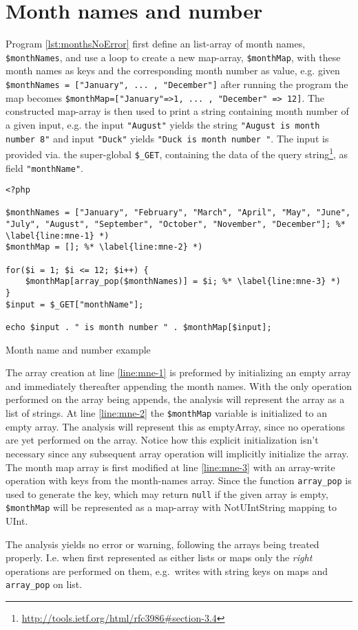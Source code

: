 \section{Month names and number}


Program \ref{lst:monthsNoError} first define an list-array of month names, \texttt{\$monthNames}, and use a loop to create a new map-array, \texttt{\$monthMap}, with these month names as keys and the corresponding month number as value, e.g. given \texttt{\$monthNames = ["January", ... , "December"]} after running the program the map becomes \texttt{\$monthMap=["January"=>1, ... , "December" => 12]}. The constructed map-array is then used to print a string containing month number of a given input, e.g. the input \texttt{"August"} yields the string \texttt{"August is month number 8"} and input \texttt{"Duck"} yields \texttt{"Duck is month number "}. The input is provided via. the super-global \texttt{\$\_GET}, containing the data of the query string\footnote{\url{http://tools.ietf.org/html/rfc3986\#section-3.4}}, as field \texttt{"monthName"}. 


\begin{program}
\begin{lstlisting}
<?php

$monthNames = ["January", "February", "March", "April", "May", "June", "July", "August", "September", "October", "November", "December"]; %* \label{line:mne-1} *)
$monthMap = []; %* \label{line:mne-2} *)

for($i = 1; $i <= 12; $i++) {
	$monthMap[array_pop($monthNames)] = $i; %* \label{line:mne-3} *)
}
$input = $_GET["monthName"];

echo $input . " is month number " . $monthMap[$input];
\end{lstlisting}
\caption{Month name and number example}
\label{lst:monthsNoError}
\end{program}

The array creation at line \ref{line:mne-1} is preformed by initializing an empty array and immediately thereafter appending the month names. With the only operation performed on the array being appends, the analysis will represent the array as a list of strings. At line \ref{line:mne-2} the \texttt{\$monthMap} variable is initialized to an empty array. The analysis will represent this as emptyArray, since no operations are yet performed on the array. Notice how this explicit initialization isn't necessary since any subsequent array operation will implicitly initialize the array. The month map array is first modified at line \ref{line:mne-3} with an array-write operation with keys from the month-names array. Since the function \texttt{array\_pop} is used to generate the key, which may return \texttt{null} if the given array is empty, \texttt{\$monthMap} will be represented as a map-array with NotUIntString mapping to UInt. 

The analysis yields no error or warning, following the arrays being treated properly. I.e. when first represented as either lists or maps only the \emph{right} operations are performed on them, e.g.\ writes with string keys on maps and \texttt{array\_pop} on list.  
